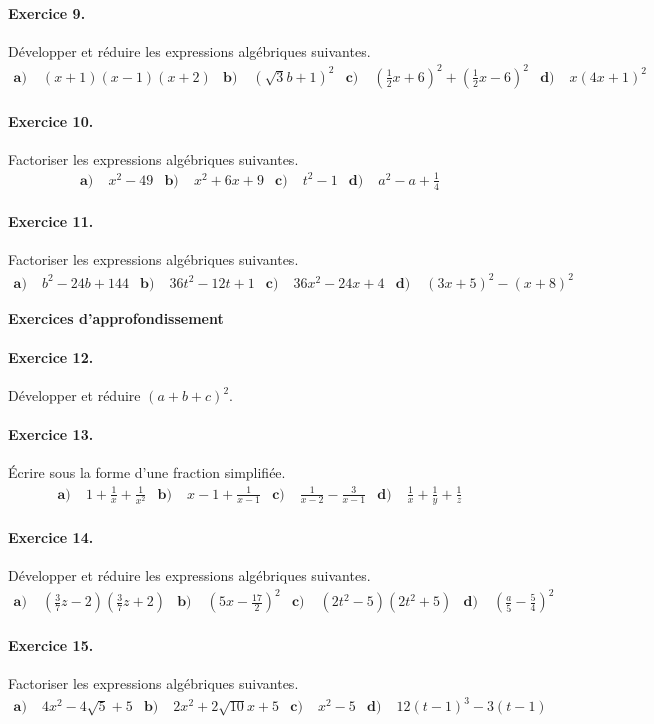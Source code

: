 \documentclass[11pt]{article}
\begin{document}
\paragraph{Exercice 9.} Développer et réduire les expressions algébriques
suivantes.
\begin{align*}
  \textbf{a)}\;& (x+1)(x-1)(x+2) &
  \textbf{b)}\;& \left( \sqrt3b+1 \right)^2 &
  \textbf{c)}\;& \left( \frac{1}{2}x+6 \right)^2+\left( \frac{1}{2}x -6\right)^2
  &
  \textbf{d)}\;& x(4x+1)^2
\end{align*}

\paragraph{Exercice 10.} Factoriser les expressions algébriques suivantes.
\begin{align*}
  \textbf{a)}\;& x^2-49 &
  \textbf{b)}\;& x^2+6x+9 &
  \textbf{c)}\;& t^2-1 &
  \textbf{d)}\;& a^2-a+\frac{1}{4}
\end{align*}

\paragraph{Exercice 11.} Factoriser les expressions algébriques suivantes.
\begin{align*}
  \textbf{a)}\;& b^2-24b+144 &
  \textbf{b)}\;& 36t^2-12t+1 &
  \textbf{c)}\;& 36x^2-24x+4 &
  \textbf{d)}\;& (3x+5)^2-(x+8)^2
\end{align*}
\begin{center}
  \LARGE \textbf{Exercices d'approfondissement}
\end{center}

\paragraph{Exercice 12.} Développer et réduire $(a+b+c)^2$.

\paragraph{Exercice 13.} Écrire sous la forme d'une fraction simplifiée.
\begin{align*}
  \textbf{a)}\;& 1+\frac{1}{x}+\frac{1}{x^2} &
  \textbf{b)}\;& x-1+\frac{1}{x-1} &
  \textbf{c)}\;& \frac{1}{x-2}-\frac{3}{x-1} &
  \textbf{d)}\;& \frac{1}{x}+\frac{1}{y}+\frac{1}{z}
\end{align*}

\paragraph{Exercice 14.} Développer et réduire les expressions algébriques
suivantes.
\begin{align*}
  \textbf{a)}\;& \left( \frac{3}{7}z-2 \right)\left( \frac{3}{7}z+2 \right) &
  \textbf{b)}\;& \left( 5x-\frac{17}{2} \right)^2 &
  \textbf{c)}\;& (2t^2-5)(2t^2+5) &
  \textbf{d)}\;& \left( \frac{a}{5}-\frac{5}{4} \right)^2
\end{align*}

\paragraph{Exercice 15.} Factoriser les expressions algébriques suivantes.
\begin{align*}
  \textbf{a)}\;& 4x^2-4\sqrt5+5 &
  \textbf{b)}\;& 2x^2+2\sqrt{10}x+5 &
  \textbf{c)}\;& x^2-5 &
  \textbf{d)}\;& 12(t-1)^3-3(t-1)
\end{align*}
\end{document}
